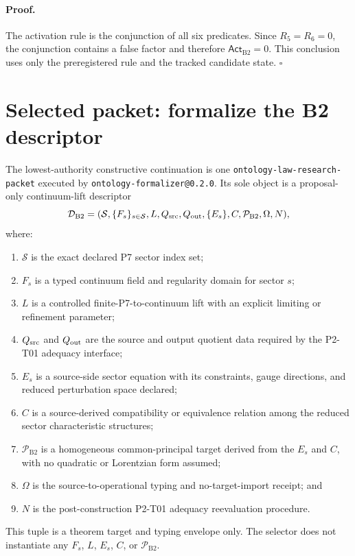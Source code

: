 \documentclass[11pt]{article}
\newcommand{\Btwo}{\mathrm{B2}}
\newcommand{\Act}{\mathsf{Act}_{\Btwo}}
\newcommand{\Desc}{\mathcal{D}_{\Btwo}}
\newcommand{\Psrc}{\mathcal{P}_{\Btwo}}
\begin{document}
\paragraph{Proof.}
The activation rule is the conjunction of all six predicates. Since
$R_5=R_6=0$, the conjunction contains a false factor and therefore
$\Act=0$. This conclusion uses only the preregistered rule and the tracked
candidate state. $\square$

\section{Selected packet: formalize the B2 descriptor}

The lowest-authority constructive continuation is one
\texttt{ontology-law-research-packet} executed by
\texttt{ontology-formalizer@0.2.0}. Its sole object is a proposal-only
continuum-lift descriptor
\[
\Desc=(\mathcal{S},\{F_s\}_{s\in\mathcal{S}},L,
Q_{\rm src},Q_{\rm out},\{E_s\},C,\Psrc,\Omega,N),
\]
where:
\begin{enumerate}
  \item $\mathcal{S}$ is the exact declared P7 sector index set;
  \item $F_s$ is a typed continuum field and regularity domain for sector $s$;
  \item $L$ is a controlled finite-P7-to-continuum lift with an explicit
        limiting or refinement parameter;
  \item $Q_{\rm src}$ and $Q_{\rm out}$ are the source and output quotient
        data required by the P2-T01 adequacy interface;
  \item $E_s$ is a source-side sector equation with its constraints, gauge
        directions, and reduced perturbation space declared;
  \item $C$ is a source-derived compatibility or equivalence relation among
        the reduced sector characteristic structures;
  \item $\Psrc$ is a homogeneous common-principal target derived from the
        $E_s$ and $C$, with no quadratic or Lorentzian form assumed;
  \item $\Omega$ is the source-to-operational typing and no-target-import
        receipt; and
  \item $N$ is the post-construction P2-T01 adequacy reevaluation procedure.
\end{enumerate}

This tuple is a theorem target and typing envelope only. The selector does
not instantiate any $F_s$, $L$, $E_s$, $C$, or $\Psrc$.
\end{document}
